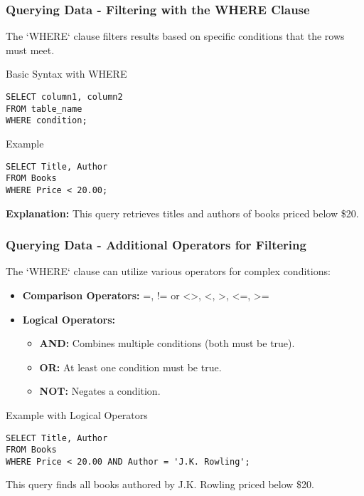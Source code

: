 \documentclass[aspectratio=169]{beamer}
\begin{document}
\begin{frame}[fragile]
    \frametitle{Querying Data - Filtering with the WHERE Clause}
    The `WHERE` clause filters results based on specific conditions that the rows must meet.

    \begin{block}{Basic Syntax with WHERE}
        \begin{lstlisting}
SELECT column1, column2
FROM table_name
WHERE condition;
        \end{lstlisting}
    \end{block}

    \begin{block}{Example}
        \begin{lstlisting}
SELECT Title, Author 
FROM Books 
WHERE Price < 20.00;
        \end{lstlisting}
    \end{block}

    \textbf{Explanation:} This query retrieves titles and authors of books priced below \$20.
\end{frame}

\begin{frame}[fragile]
    \frametitle{Querying Data - Additional Operators for Filtering}
    The `WHERE` clause can utilize various operators for complex conditions:
    
    \begin{itemize}
        \item \textbf{Comparison Operators:} =, != or <>, <, >, <=, >=
        \item \textbf{Logical Operators:}
            \begin{itemize}
                \item \textbf{AND:} Combines multiple conditions (both must be true).
                \item \textbf{OR:} At least one condition must be true.
                \item \textbf{NOT:} Negates a condition.
            \end{itemize}
    \end{itemize}

    \begin{block}{Example with Logical Operators}
        \begin{lstlisting}
SELECT Title, Author 
FROM Books 
WHERE Price < 20.00 AND Author = 'J.K. Rowling';
        \end{lstlisting}
    \end{block}

    This query finds all books authored by J.K. Rowling priced below \$20.
\end{frame}
\end{document}

